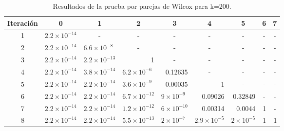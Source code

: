\documentclass{article}
\begin{document}
\begin{table}[h!]
\centering
\caption{Resultados de la prueba por parejas de Wilcox para k=200.}
\label{tabla10}
\begin{tabular}{|c|l|l|l|l|c|c|c|c|}
\hline
Iteración & \multicolumn{1}{c|}{\textbf{0}} & \multicolumn{1}{c|}{\textbf{1}} & \multicolumn{1}{c|}{\textbf{2}} & \multicolumn{1}{c|}{\textbf{3}} & \textbf{4} & 5 & 6 & 7 \\ \hline
1 & $2.2\times 10^{-14}$ & \multicolumn{1}{c|}{-} & \multicolumn{1}{c|}{-} & \multicolumn{1}{c|}{-} & - & - & - & - \\ \hline
2 & $2.2\times 10^{-14}$ & $6.6\times 10^{-8}$ & \multicolumn{1}{c|}{-} & \multicolumn{1}{c|}{-} & - & - & - & - \\ \hline
3 & $2.2\times 10^{-14}$ & $2.2\times 10^{-13}$ & \multicolumn{1}{r|}{1} & \multicolumn{1}{c|}{-} & - & - & - & - \\ \hline
4 & $2.2\times 10^{-14}$ & $3.8\times 10^{-14}$ & $6.2\times 10^{-6}$ & \multicolumn{1}{r|}{0.12635} & - & - & - & - \\ \hline
5 & $2.2\times 10^{-14}$ & $2.2\times 10^{-14}$ & $3.6\times 10^{-9}$ & \multicolumn{1}{r|}{0.00035} & \multicolumn{1}{r|}{1} & - & - & - \\ \hline
6 & $2.2\times 10^{-14}$ & $2.2\times 10^{-14}$ & $6.7\times 10^{-12}$ & $9\times 10^{-9}$ & \multicolumn{1}{r|}{0.09026} & \multicolumn{1}{r|}{0.32849} & - & - \\ \hline
7 & $2.2\times 10^{-14}$ & $2.2\times 10^{-14}$ & $1.2\times 10^{-12}$ & $6\times 10^{-10}$ & \multicolumn{1}{r|}{0.00314} & \multicolumn{1}{r|}{0.0044} & \multicolumn{1}{r|}{1} & - \\ \hline
8 & $2.2\times 10^{-14}$ & $2.2\times 10^{-14}$ & $5.5\times 10^{-13}$ & $2\times 10^{-7}$ & \multicolumn{1}{r|}{$2.9\times 10^{-5}$} & \multicolumn{1}{r|}{$2\times 10^{-5}$} & \multicolumn{1}{r|}{1} & \multicolumn{1}{r|}{1} \\ \hline
\end{tabular}
\end{table}
\end{document}
